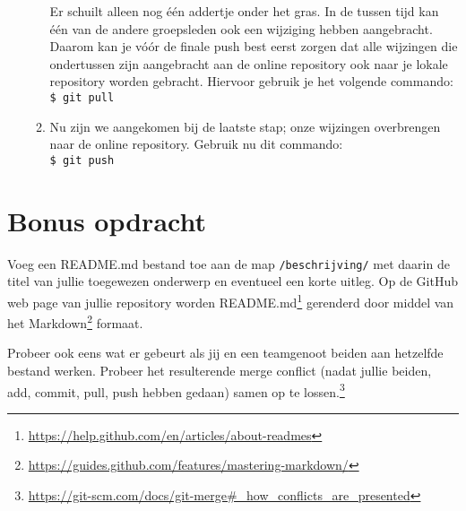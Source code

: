 \documentclass[a4paper]{article}
\begin{document}
\begin{enumerate}
\begin{enumerate}
            Er schuilt alleen nog \'e\'en addertje onder het gras.
            In de tussen tijd kan \'e\'en van de andere groepsleden ook een wijziging hebben aangebracht.
            Daarom kan je v\'o\'or de finale push best eerst zorgen dat alle wijzingen die ondertussen zijn aangebracht aan de online repository ook naar je lokale repository worden gebracht.
            Hiervoor gebruik je het volgende commando: \\
            \texttt{\$ git pull}
        \item Nu zijn we aangekomen bij de laatste stap; onze wijzingen overbrengen naar de online repository.
            Gebruik nu dit commando: \\
            \texttt{\$ git push}
    \end{enumerate}
\end{enumerate}

\section{Bonus opdracht}

Voeg een README.md bestand toe aan de map \texttt{/beschrijving/} met daarin de titel van jullie toegewezen onderwerp en eventueel een korte uitleg.
Op de GitHub web page van jullie repository worden README.md\footnote{\url{https://help.github.com/en/articles/about-readmes}} gerenderd door middel van het Markdown\footnote{\url{https://guides.github.com/features/mastering-markdown/}} formaat.

Probeer ook eens wat er gebeurt als jij en een teamgenoot beiden aan hetzelfde bestand werken.
Probeer het resulterende merge conflict (nadat jullie beiden, add, commit, pull, push hebben gedaan) samen op te lossen.\footnote{\url{https://git-scm.com/docs/git-merge#_how_conflicts_are_presented}}



\end{document}
